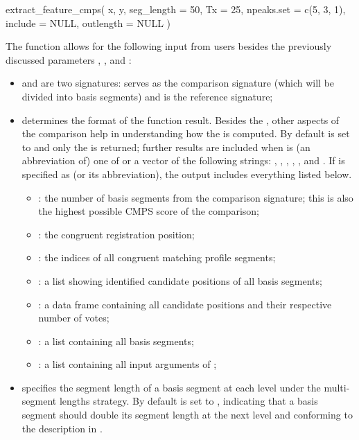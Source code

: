 \begin{Schunk}
\begin{Sinput}
extract_feature_cmps(
  x,
  y,
  seg_length = 50,
  Tx = 25,
  npeaks.set = c(5, 3, 1),
  include = NULL,
  outlength = NULL
)
\end{Sinput}
\end{Schunk}

The function  allows for the following
input from users besides the previously discussed parameters
, , and :

\begin{itemize}
\item
   and  are two signatures:  serves as the
  comparison signature (which will be divided into basis segments) and
   is the reference signature;
\item
   determines the format of the function result. Besides
  the , other aspects of the comparison help in
  understanding how the  is computed. By default
   is set to  and only the  is
  returned; further results are included when  is (an
  abbreviation of) one of or a vector of the following strings:
  , , ,
  , , and . If
   is specified as  (or its
  abbreviation), the output includes everything listed below.

  \begin{itemize}
  \tightlist
  \item
    : the number of basis segments from the comparison
    signature; this is also the highest possible CMPS score of the
    comparison;
  \item
    : the congruent registration position;
  \item
    : the indices of all congruent matching
    profile segments;
  \item
    : a list showing identified candidate positions of
    all basis segments;
  \item
    : a data frame containing all candidate positions and
    their respective number of votes;
  \item
    : a list containing all basis segments;
  \item
    : a list containing all input arguments of
    ;
  \end{itemize}
\item
   specifies the segment length of a basis segment at
  each level under the multi-segment lengths strategy. By default
   is set to , indicating that a basis
  segment should double its segment length at the next level and
  conforming to the description in \citet{cmps} .
\end{itemize}

